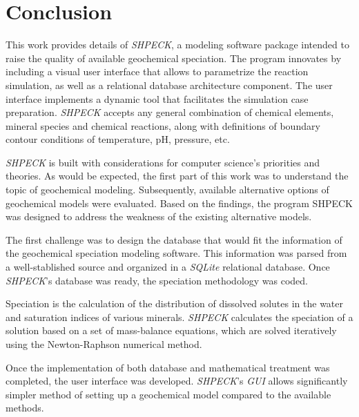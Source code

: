
\chapter{Conclusion}
\label{chapter:conclusion}

This work provides details of \emph{SHPECK}, a modeling software package intended to raise the quality of available geochemical speciation. The program innovates by including a visual user interface that allows to parametrize the reaction simulation, as well as a relational database architecture component. The user interface implements a dynamic tool that facilitates the simulation case preparation. \emph{SHPECK} accepts any general combination of chemical elements, mineral species and chemical reactions, along with definitions of boundary contour conditions of temperature, pH, pressure, etc.

\emph{SHPECK} is built with considerations for computer science's priorities and theories. As would be expected, the first part of this work was to understand the topic of geochemical modeling. Subsequently, available alternative options of geochemical models were evaluated. Based on the findings, the program SHPECK was designed to address the weakness of the existing alternative models. 


The first challenge was to design the database that would fit the information of the geochemical speciation modeling software. This information was parsed from a well-stablished source and organized in a \emph{SQLite} relational database. Once \emph{SHPECK}'s database was ready, the speciation methodology was coded.

Speciation is the calculation of the distribution of dissolved solutes in the water and saturation indices of various minerals. \emph{SHPECK} calculates the speciation of a solution based on a set of mass-balance equations, which are solved iteratively using the Newton-Raphson numerical method.

Once the implementation of both database and mathematical treatment was completed, the user interface was developed. \emph{SHPECK}'s \emph{GUI} allows significantly simpler method of setting up a geochemical model compared to the available methods.

